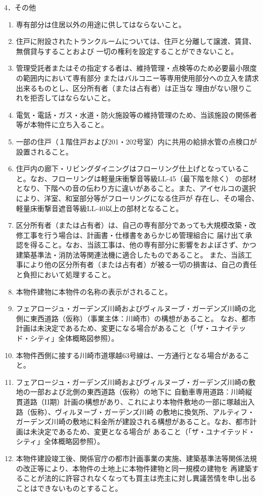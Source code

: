 \documentclass[
  luatex,
  paper=a4paper,
  fontsize=11pt,
  jafontsize=11pt,
  jlreq_notes,
]{jlreq}
\begin{document}
  4．その他
  \begin{enumerate}
  \item 専有部分は住居以外の用途に供してはならないこと。
  \item 住戸に附設されたトランクルームについては、住戸と分離して譲渡、賃貸、無償貸与することおよび
        一切の権利を設定することができないこと。
  \item 管理受託者またはその指定する者は、維持管理・点検等のため必要最小限度の範囲内において専有部分
        またはバルコニー等専用使用部分への立入を請求出来るものとし、区分所有者（または占有者）は正当な
        理由がない限りこれを拒否してはならないこと。
  \item 電気・電話・ガス・水道・防火施設等の維持管理のため、当該施設の関係者等が本物件に立ち入ること。
  \item 一部の住戸（１階住戸および201・202号室）内に共用の給排水管の点検口が設置されること。
  \item 住戸内の廊下・リビングダイニングはフローリング仕上げとなっていること。なお、フローリングは軽量床衝撃音等級LL-45（最下階を除く）
        の部材となり、下階への音の伝わり方に違いがあること。また、アイセルコの選択により、洋室、和室部分等がフローリングになる住戸が
        存在し、その場合、軽量床衝撃音遮音等級LL-40以上の部材となること。
  \item 区分所有者（または占有者）は、自己の専有部分であっても大規模改築・改修工事を行う場合は、計画書・仕様書をあらかじめ管理組合に
        届け出て承認を得ること。なお、当該工事は、他の専有部分に影響をおよぼさず、かつ建築基準法・消防法等関連法機に適合したものであること。
        また、当該工事により他の区分所有者（または占有者）が被る一切の損害は、自己の責任と負担において処理すること。
  \item 本物件建物に本物件の名称の表示がされること。
  \item フェアロージュ・ガーデンズ川崎およびヴィルヌーブ・ガーデンズ川崎の北側に東西道路（仮称）（事業主体：川崎市）の構想があること。
        なお、都市計画は未決定であるため、変更になる場合があること（「ザ・ユナイテッド・シティ」全体概略図参照）。
  \item 本物件西側に接する川崎市道塚越63号線は、一方通行となる場合があること。
  \item フェアロージュ・ガーデンズ川崎およびヴィルヌーブ・ガーデンズ川崎の敷地の一部および北側の東西道路（仮称）の地下に
        自動車専用道路：川崎縦貫道路（II期）計画の構想があり、これにより本物件敷地の一部に塚越出入路（仮称）、ヴィルヌーブ・ガーデンズ川崎
        の敷地に換気所、アルティフ・ガーデンズ川崎の敷地に料金所が建設される構想があること。なお、都市計画は未決定であるため、変更となる場合が
        あること（「ザ・ユナイテッド・シティ」全体概略図参照）。
  \item 本物件建設竣工後、関係官庁の都市計画事業の実施、建築基準法等関係法規の改正等により、本物件の土地上に本物件建物と同一規模の建物を
        再建築することが法的に許容されなくなっても買主は売主に対し異議苦情を申し出ることはできないものとすること。
  

\end{enumerate}
\end{document}
